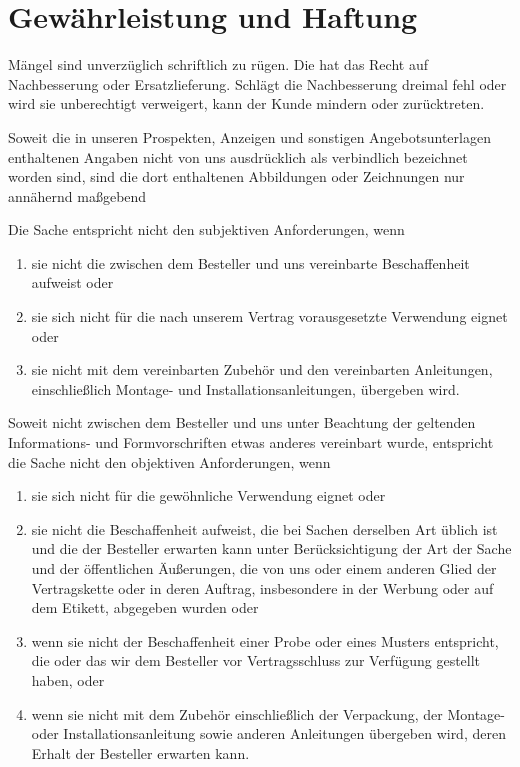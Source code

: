 \documentclass[fontsize=12pt,parskip=half]{scrartcl}
\begin{document}
\section{Gewährleistung und Haftung}

\begin{contract}

\Clause[title={Mängelansprüche}]

Mängel sind unverzüglich schriftlich zu rügen. Die \companyName{} hat das Recht auf Nachbesserung oder Ersatzlieferung. Schlägt die Nachbesserung dreimal fehl oder wird sie unberechtigt verweigert, kann der Kunde mindern oder zurücktreten.

Soweit die in unseren Prospekten, Anzeigen und sonstigen Angebotsunterlagen enthaltenen Angaben nicht von uns ausdrücklich als verbindlich bezeichnet worden sind, sind die dort enthaltenen Abbildungen oder Zeichnungen nur annähernd maßgebend

Die Sache entspricht nicht den subjektiven Anforderungen, wenn
\begin{enumerate}
	\item sie nicht die zwischen dem Besteller und uns vereinbarte Beschaffenheit aufweist oder
	\item sie sich nicht für die nach unserem Vertrag vorausgesetzte Verwendung eignet oder
	\item sie nicht mit dem vereinbarten Zubehör und den vereinbarten Anleitungen, einschließlich Montage- und Installationsanleitungen, übergeben wird.
\end{enumerate}

Soweit nicht zwischen dem Besteller und uns unter Beachtung der geltenden Informations- und Formvorschriften etwas anderes vereinbart wurde, entspricht die Sache nicht den objektiven Anforderungen, wenn
\begin{enumerate}
	\item sie sich nicht für die gewöhnliche Verwendung eignet oder
	\item sie nicht die Beschaffenheit aufweist, die bei Sachen derselben Art üblich ist und die der Besteller erwarten kann unter Berücksichtigung der Art der Sache und der öffentlichen Äußerungen, die von uns oder einem anderen Glied der Vertragskette oder in deren Auftrag, insbesondere in der Werbung oder auf dem Etikett, abgegeben wurden oder
	\item wenn sie nicht der Beschaffenheit einer Probe oder eines Musters entspricht, die oder das wir dem Besteller vor Vertragsschluss zur Verfügung gestellt haben, oder
	\item wenn sie nicht mit dem Zubehör einschließlich der Verpackung, der Montage- oder Installationsanleitung sowie anderen Anleitungen übergeben wird, deren Erhalt der Besteller erwarten kann.
\end{enumerate}


\end{contract}
\end{document}
